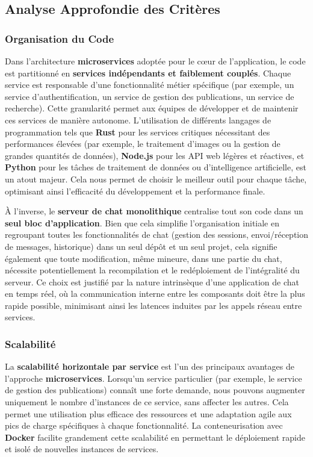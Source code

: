 \documentclass[12pt]{rapportPfe}
\begin{document}
\subsection{Analyse Approfondie des Critères}

\subsubsection{Organisation du Code}

Dans l'architecture \textbf{microservices} adoptée pour le cœur de l'application, le code est partitionné en \textbf{services indépendants et faiblement couplés}. Chaque service est responsable d'une fonctionnalité métier spécifique (par exemple, un service d'authentification, un service de gestion des publications, un service de recherche). Cette granularité permet aux équipes de développer et de maintenir ces services de manière autonome. L'utilisation de différents langages de programmation tels que \textbf{Rust} pour les services critiques nécessitant des performances élevées (par exemple, le traitement d'images ou la gestion de grandes quantités de données), \textbf{Node.js} pour les API web légères et réactives, et \textbf{Python} pour les tâches de traitement de données ou d'intelligence artificielle, est un atout majeur. Cela nous permet de choisir le meilleur outil pour chaque tâche, optimisant ainsi l'efficacité du développement et la performance finale.

À l'inverse, le \textbf{serveur de chat monolithique} centralise tout son code dans un \textbf{seul bloc d'application}. Bien que cela simplifie l'organisation initiale en regroupant toutes les fonctionnalités de chat (gestion des sessions, envoi/réception de messages, historique) dans un seul dépôt et un seul projet, cela signifie également que toute modification, même mineure, dans une partie du chat, nécessite potentiellement la recompilation et le redéploiement de l'intégralité du serveur. Ce choix est justifié par la nature intrinsèque d'une application de chat en temps réel, où la communication interne entre les composants doit être la plus rapide possible, minimisant ainsi les latences induites par les appels réseau entre services.

\subsubsection{Scalabilité}

La \textbf{scalabilité horizontale par service} est l'un des principaux avantages de l'approche \textbf{microservices}. Lorsqu'un service particulier (par exemple, le service de gestion des publications) connaît une forte demande, nous pouvons augmenter uniquement le nombre d'instances de ce service, sans affecter les autres. Cela permet une utilisation plus efficace des ressources et une adaptation agile aux pics de charge spécifiques à chaque fonctionnalité. La conteneurisation avec \textbf{Docker} facilite grandement cette scalabilité en permettant le déploiement rapide et isolé de nouvelles instances de services.
\end{document}
